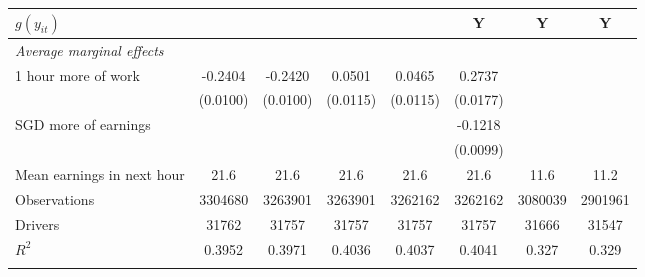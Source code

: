 \documentclass[reviewmode,AEJ]{AEA}
\begin{document}
\begin{table}[]
{\begin{tabularx}{\textwidth}{l@{\extracolsep{\fill}}*{7}{S[table-format = 0.4, table-space-text-pre={**}, table-space-text-post={-**}]}}
			\(g(y_{it})\)&         {}         &         {}         &         {}         &         {}         &         {Y}         &  {Y} &   {Y}\\
			\midrule
			\textit{Average marginal effects} & & & & & & & \\
			1 hour more of work&     -0.2404\sym{***}         &     -0.2420\sym{***}         &      0.0501\sym{***}         &      0.0465\sym{***}         &      0.2737\sym{***}         & & \\
			&    (0.0100)         &    (0.0100)         &    (0.0115)         &    (0.0115)         &    (0.0177)         & & \\
			 SGD more of earnings&                     &                     &                     &                     &     -0.1218\sym{***}         & & \\
			&                     &                     &                     &                     &    (0.0099)         & & \\
			\midrule
			Mean earnings in next hour&     \num{21.6}         &     \num{21.6}         &     \num{21.6}         &     \num{21.6}         &     \num{21.6}         & \num{11.6} & \num{11.2}\\
			Observations&\num{3304680}         &\num{3263901}         &\num{3263901}         &\num{3262162}         &\num{3262162}         & \num{3080039}& \num{2901961}\\
			Drivers     & \num{31762}         & \num{31757}         & \num{31757}         & \num{31757}         & \num{31757}         & \num{31666} & \num{31547}\\
			\(R^2\)     &      0.3952         &      0.3971         &      0.4036         &      0.4037         &      0.4041         & 0.327 & 0.329\\
			\bottomrule& & 
		\end{tabularx}
	}
	\begin{tablenotes}
		\small

\end{tablenotes}
\end{table}
\end{document}
